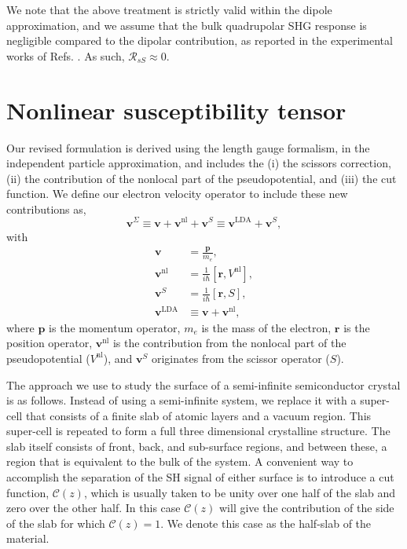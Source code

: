 \documentclass[prb,superscriptaddress,showpacs,twocolumn,letterpaper]{revtex4}
\begin{document}
We note that the above treatment is strictly valid within the dipole
approximation, and we assume that the bulk quadrupolar SHG response is
negligible compared to the dipolar contribution, as reported in the experimental
works of Refs. . As such, $\mathcal{R}_{sS} \approx 0$.


\section{Nonlinear susceptibility tensor}\label{sec:tensor}

Our revised formulation is derived using the length gauge formalism, in the
independent particle approximation, and includes the (i) the scissors
correction, (ii) the contribution of the nonlocal part of the pseudopotential,
and (iii) the cut function.\cite{andersonPRB15} We define our electron velocity
operator to include these new contributions as,
\begin{equation*}\label{eq:vop2}
\mathbf{v}^\Sigma \equiv \mathbf{v} + \mathbf{v}^\mathrm{nl} + \mathbf{v}^S
                  \equiv \mathbf{v}^\mathrm{LDA} + \mathbf{v}^S,
\end{equation*}
with
\begin{align*}
\mathbf{v} &=\frac{\mathbf{p}}{m_e},\nonumber\\
\mathbf{v}^\mathrm{nl} 
&= \frac{1}{i\hbar}[\mathbf{r},V^\mathrm{nl}],\label{eq:vnl}\\
\mathbf{v}^S &= \frac{1}{i\hbar}[\mathbf{r}, S],\nonumber\\
\mathbf{v}^\mathrm{LDA} &\equiv \mathbf{v} + \mathbf{v}^\mathrm{nl},\nonumber
\end{align*}
where  $\mathbf{p}$ is the momentum operator, $m_e$ is the mass of the electron,
$\mathbf{r}$ is the position operator, $\mathbf{v}^\mathrm{nl}$ is the
contribution from the nonlocal part of the pseudopotential ($V^\mathrm{nl}$),
and $\mathbf{v}^S$ originates from the scissor operator ($S$).

The approach we use to study the surface of a semi-infinite semiconductor
crystal is as follows. Instead of using a semi-infinite system, we replace it
with a super-cell that consists of a finite slab of atomic layers and a vacuum
region. This super-cell is repeated to form a full three dimensional crystalline
structure. The slab itself consists of front, back, and sub-surface regions, and
between these, a region that is equivalent to the bulk of the system. A
convenient way to accomplish the separation of the SH signal of either surface
is to introduce a cut function, $\mathcal{C}(z)$, which is usually taken to be
unity over one half of the slab and zero over the other half.\cite{mendozaPRL98}
In this case $\mathcal{C}(z)$ will give the contribution of the side of the slab
for which $\mathcal{C}(z)=1$. We denote this case as the half-slab of the
material.
\end{document}
